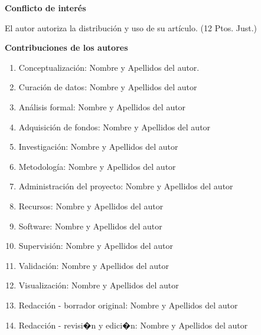\documentclass{rcci} %
\begin{document}



\begin{center}
	\textbf{Conflicto de inter\'es}
\end{center}
El autor autoriza la distribuci\'on y uso de su art\'iculo. (12 Ptos. Just.)

\begin{center}
	\textbf{Contribuciones de los autores} 
\end{center}
\begin{enumerate}
	\item Conceptualizaci\'on: Nombre y Apellidos del autor.
	\item Curaci\'on de datos: Nombre y Apellidos del autor
	\item An\'alisis formal: Nombre y Apellidos del autor 
	\item Adquisici\'on de fondos: Nombre y Apellidos del autor
	\item Investigaci\'on: Nombre y Apellidos del autor 
	\item Metodolog\'ia: Nombre y Apellidos del autor
	\item Administraci\'on del proyecto: Nombre y Apellidos del autor
	\item Recursos: Nombre y Apellidos del autor
	\item Software: Nombre y Apellidos del autor 
	\item Supervisi\'on: Nombre y Apellidos del autor
	\item Validaci\'on: Nombre y Apellidos del autor
	\item Visualizaci\'on: Nombre y Apellidos del autor
	\item Redacci\'on - borrador original: Nombre y Apellidos del autor
	\item Redacci\'on - revisi�n y edici�n: Nombre y Apellidos del autor
\end{enumerate}
\end{document}
